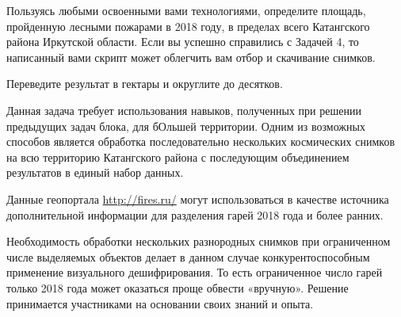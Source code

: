 
Пользуясь любыми освоенными вами технологиями, определите площадь, пройденную лесными пожарами в 2018 году, в пределах 
всего Катангского района Иркутской области. Если вы успешно справились с Задачей 4, то написанный вами скрипт может облегчить вам отбор и скачивание снимков.

Переведите результат в гектары и округлите до десятков.

\explanationSection

Данная задача требует использования навыков, полученных при решении предыдущих задач блока, для бОльшей территории. Одним из возможных способов является обработка последовательно нескольких космических снимков на всю территорию Катангского района с последующим объединением результатов в единый набор данных.

Данные геопортала \url{http://fires.ru/} могут использоваться в качестве источника дополнительной информации для разделения гарей 2018 года и более ранних.

Необходимость обработки нескольких разнородных снимков при ограниченном числе выделяемых объектов делает в данном случае конкурентоспособным применение визуального дешифрирования. То есть ограниченное число гарей только 2018 года может оказаться проще обвести «вручную». Решение принимается участниками на основании своих знаний и опыта.

